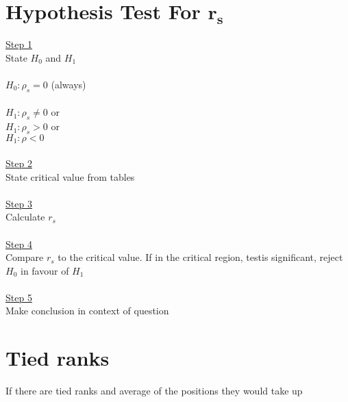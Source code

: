\documentclass{article}[18pt]
\begin{document}
\section{Hypothesis Test For $\mathbf{r_s}$}
\underline{Step 1}\\
State $H_0$ and $H_1$\\
\\
$H_0: \rho_s=0$ (always)\\
\\
$H_1: \rho_s\neq0$ or\\
$H_1: \rho_s>0$ or\\
$H_1: \rho<0$\\
\\
\underline{Step 2}\\
State critical value from tables\\
\\
\underline{Step 3}\\
Calculate $r_s$\\
\\
\underline{Step 4}\\
Compare $r_s$ to the critical value. If in the critical region, testis significant, reject $H_0$ in favour of $H_1$\\
\\
\underline{Step 5}\\
Make conclusion in context of question
\section{Tied ranks}
If there are tied ranks and average of the positions they would take up
\end{document}
